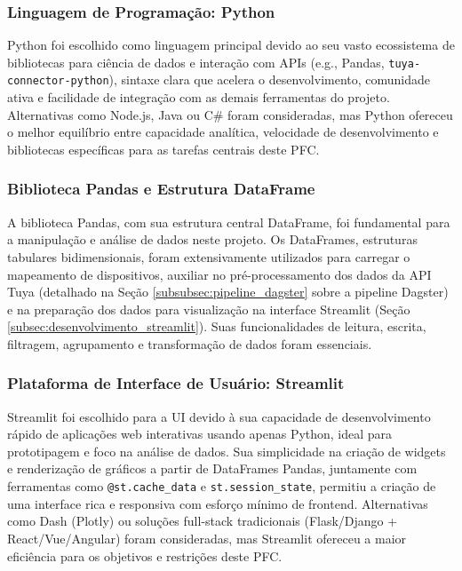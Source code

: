 \subsubsection{Linguagem de Programação: Python}
Python foi escolhido como linguagem principal devido ao seu vasto ecossistema de bibliotecas para ciência de dados e interação com APIs (e.g., Pandas, \texttt{tuya-connector-python}), sintaxe clara que acelera o desenvolvimento, comunidade ativa e facilidade de integração com as demais ferramentas do projeto. Alternativas como Node.js, Java ou C\# foram consideradas, mas Python ofereceu o melhor equilíbrio entre capacidade analítica, velocidade de desenvolvimento e bibliotecas específicas para as tarefas centrais deste PFC.

\subsubsection{Biblioteca Pandas e Estrutura DataFrame}
\label{subsubsec:pandas_dataframe}
A biblioteca Pandas, com sua estrutura central DataFrame, foi fundamental para a manipulação e análise de dados neste projeto. Os DataFrames, estruturas tabulares bidimensionais, foram extensivamente utilizados para carregar o mapeamento de dispositivos, auxiliar no pré-processamento dos dados da API Tuya (detalhado na Seção \ref{subsubsec:pipeline_dagster} sobre a pipeline Dagster) e na preparação dos dados para visualização na interface Streamlit (Seção \ref{subsec:desenvolvimento_streamlit}). Suas funcionalidades de leitura, escrita, filtragem, agrupamento e transformação de dados foram essenciais.

\subsubsection{Plataforma de Interface de Usuário: Streamlit}
Streamlit foi escolhido para a UI devido à sua capacidade de desenvolvimento rápido de aplicações web interativas usando apenas Python, ideal para prototipagem e foco na análise de dados. Sua simplicidade na criação de widgets e renderização de gráficos a partir de DataFrames Pandas, juntamente com ferramentas como \texttt{@st.cache\_data} e \texttt{st.session\_state}, permitiu a criação de uma interface rica e responsiva com esforço mínimo de frontend. Alternativas como Dash (Plotly) ou soluções full-stack tradicionais (Flask/Django + React/Vue/Angular) foram consideradas, mas Streamlit ofereceu a maior eficiência para os objetivos e restrições deste PFC.

